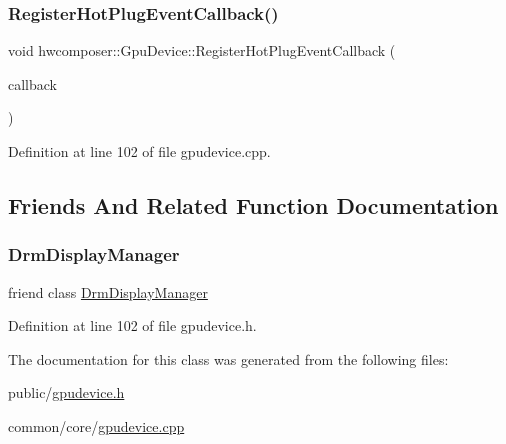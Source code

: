 \subsubsection{\texorpdfstring{Register\+Hot\+Plug\+Event\+Callback()}{RegisterHotPlugEventCallback()}}
{\footnotesize\ttfamily void hwcomposer\+::\+Gpu\+Device\+::\+Register\+Hot\+Plug\+Event\+Callback (\begin{DoxyParamCaption}\item[{std\+::shared\+\_\+ptr$<$ \mbox{\hyperlink{classhwcomposer_1_1DisplayHotPlugEventCallback}{Display\+Hot\+Plug\+Event\+Callback}} $>$}]{callback }\end{DoxyParamCaption})}



Definition at line 102 of file gpudevice.\+cpp.


\begin{DoxyCode}{0}
\end{DoxyCode}


\subsection{Friends And Related Function Documentation}
\mbox{\label{classhwcomposer_1_1GpuDevice_a4f7966ae9851735e6eddc713ec174b2f}} 
\subsubsection{\texorpdfstring{Drm\+Display\+Manager}{DrmDisplayManager}}
{\footnotesize\ttfamily friend class \mbox{\hyperlink{classhwcomposer_1_1DrmDisplayManager}{Drm\+Display\+Manager}}\hspace{0.3cm}{\ttfamily [friend]}}



Definition at line 102 of file gpudevice.\+h.



The documentation for this class was generated from the following files\+:\begin{DoxyCompactItemize}
\item 
public/\mbox{\hyperlink{gpudevice_8h}{gpudevice.\+h}}\item 
common/core/\mbox{\hyperlink{gpudevice_8cpp}{gpudevice.\+cpp}}\end{DoxyCompactItemize}
